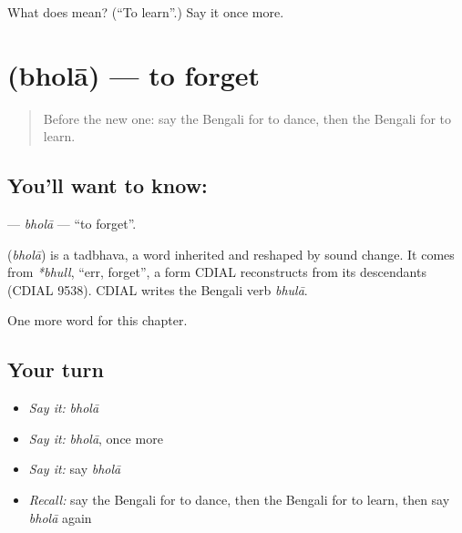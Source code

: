 \begin{tcolorbox}[breakable,colback=teal!4,colframe=teal!35!black,title={Before you move on}]
What does  mean? (\textquotedblleft{}To learn\textquotedblright{}.) Say it once more.
\end{tcolorbox}
\section[\texorpdfstring{\bn{ভোলা} (bholā)}{ভোলা (bholā)}]{ (bholā) — to forget}

\label{lesson:BN-C51-bhola}



\begin{quote}
Before the new one: say the Bengali for to dance, then the Bengali for to learn.
\end{quote}

\subsection*{You'll want to know: }
\textbf{} — \emph{bholā} — \textquotedblleft{}to forget\textquotedblright{}.

\begin{cousinweb}
\textbf{} (\emph{bholā}) is a tadbhava, a word inherited and reshaped by sound change. It comes from \emph{*bhull}, \textquotedblleft{}err, forget\textquotedblright{}, a form CDIAL reconstructs from its descendants (CDIAL 9538). CDIAL writes the Bengali verb \emph{bhulā}.
\end{cousinweb}

\begin{grammarlens}[title={What you've built}]
One more word for this chapter.
\end{grammarlens}

\subsection*{Your turn}
\begin{itemize}
\raggedright
  \item \emph{Say it:} \emph{bholā}
  \item \emph{Say it:} \emph{bholā}, once more
  \item \emph{Say it:} say \emph{bholā}
  \item \emph{Recall:} say the Bengali for to dance, then the Bengali for to learn, then say \emph{bholā} again
\end{itemize}

